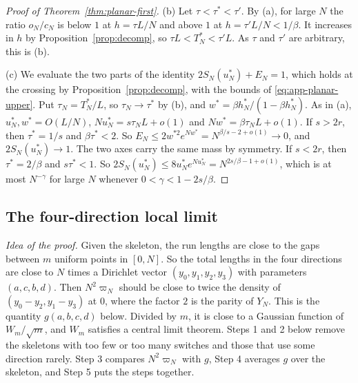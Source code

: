 \begin{proof}[Proof of Theorem~\ref{thm:planar-first}]
(b) Let $\tau<\tau^*<\tau'$. By (a), for large $N$ the ratio $o_N/c_N$ is below $1$ at
$h=\tau L/N$ and above $1$ at $h=\tau'L/N<1/\beta$. It increases in $h$ by
Proposition~\ref{prop:decomp}, so $\tau L<T^*_N<\tau'L$. As $\tau$ and $\tau'$ are arbitrary, this
is (b).

(c) We evaluate the two parts of the identity $2S_N(u^*_N)+E_N=1$, which holds at the crossing by
Proposition~\ref{prop:decomp}, with the bounds of \eqref{eq:app-planar-upper}. Put
$\tau_N=T^*_N/L$, so $\tau_N\to\tau^*$ by (b), and $w^*=\beta h^*_N/(1-\beta h^*_N)$. As in
(a), $u^*_N,w^*=O(L/N)$, $Nu^*_N=s\tau_NL+o(1)$ and $Nw^*=\beta\tau_NL+o(1)$. If $s>2r$, then
$\tau^*=1/s$ and $\beta\tau^*<2$. So $E_N\le2w^{*2}e^{Nw^*}=N^{\beta/s-2+o(1)}\to0$, and
$2S_N(u^*_N)\to1$. The two axes carry the same mass by symmetry. If $s<2r$, then
$\tau^*=2/\beta$ and $s\tau^*<1$. So
$2S_N(u^*_N)\le8u^*_Ne^{Nu^*_N}=N^{2s/\beta-1+o(1)}$, which is at most $N^{-\gamma}$ for large $N$
whenever $0<\gamma<1-2s/\beta$.
\end{proof}

\subsection{The four-direction local limit}

\emph{Idea of the proof.} Given the skeleton, the run lengths are close to the gaps between $m$
uniform points in $[0,N]$.
So the total lengths in the four directions are close to $N$ times a Dirichlet vector
$(y_0,y_1,y_2,y_3)$ with parameters $(a,c,b,d)$. Then $N^2\varpi_N$ should be close to twice the
density of $(y_0-y_2,y_1-y_3)$ at $0$, where the factor $2$ is the parity of $Y_N$. This is the
quantity $g(a,b,c,d)$ below. Divided by $m$, it is close to a Gaussian function of $W_m/\sqrt m$,
and $W_m$ satisfies a central limit theorem. Steps 1 and 2 below remove the skeletons with too few
or too many switches and those that use some direction rarely. Step 3 compares $N^2\varpi_N$ with
$g$, Step 4 averages $g$ over the skeleton, and Step 5 puts the steps together.

